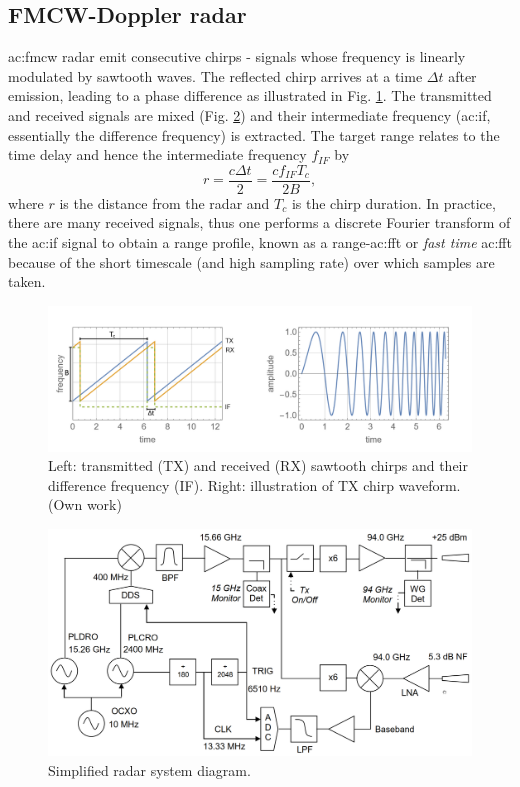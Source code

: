 \documentclass{article}
\begin{document}
\subsection{FMCW-Doppler radar}
\acrshort{ac:fmcw} radar emit consecutive chirps - signals whose frequency is linearly modulated by sawtooth waves. The reflected chirp arrives at a time \(\Delta t\) after emission, leading to a phase difference as illustrated in Fig. \ref{fig:Chirp}. The transmitted and received signals are mixed (Fig. \ref{fig:RadarDiagram}) and their intermediate frequency (\acrshort{ac:if}, essentially the difference frequency) is extracted. The target range relates to the time delay and hence the intermediate frequency \(f_{IF}\) by
\begin{equation}
	r = \frac{c \Delta t}{2} = \frac{c f_{IF} T_c}{2 B},
\end{equation}
where \(r\) is the distance from the radar and \(T_c\) is the chirp duration.\supercite{TIFMCWDoppler}
In practice, there are many received signals, thus one performs a discrete Fourier transform of the \acrshort{ac:if} signal to obtain a range profile, known as a range-\acrshort{ac:fft} or \textit{fast time} \acrshort{ac:fft} because of the short timescale (and high sampling rate) over which samples are taken.

\begin{figure}
	\centering
	\includegraphics[width=\textwidth]{chirp}
	\caption{Left: transmitted (TX) and received (RX) sawtooth chirps and their difference frequency (IF). Right: illustration of TX chirp waveform. (Own work)}
	\label{fig:Chirp}
\end{figure}

\begin{figure}
	\centering
	\includegraphics[width=\textwidth]{radar-diagram}
	\caption{Simplified radar system diagram.\supercite{Radar}}
	\label{fig:RadarDiagram}
\end{figure}
\end{document}
